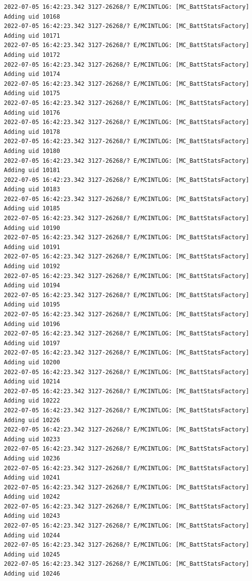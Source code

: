 \documentclass[a4paper,12pt]{book}
\begin{document}
\begin{lstlisting}
2022-07-05 16:42:23.342 3127-26268/? E/MCINTLOG: [MC_BattStatsFactory] Adding uid 10168
2022-07-05 16:42:23.342 3127-26268/? E/MCINTLOG: [MC_BattStatsFactory] Adding uid 10171
2022-07-05 16:42:23.342 3127-26268/? E/MCINTLOG: [MC_BattStatsFactory] Adding uid 10172
2022-07-05 16:42:23.342 3127-26268/? E/MCINTLOG: [MC_BattStatsFactory] Adding uid 10174
2022-07-05 16:42:23.342 3127-26268/? E/MCINTLOG: [MC_BattStatsFactory] Adding uid 10175
2022-07-05 16:42:23.342 3127-26268/? E/MCINTLOG: [MC_BattStatsFactory] Adding uid 10176
2022-07-05 16:42:23.342 3127-26268/? E/MCINTLOG: [MC_BattStatsFactory] Adding uid 10178
2022-07-05 16:42:23.342 3127-26268/? E/MCINTLOG: [MC_BattStatsFactory] Adding uid 10180
2022-07-05 16:42:23.342 3127-26268/? E/MCINTLOG: [MC_BattStatsFactory] Adding uid 10181
2022-07-05 16:42:23.342 3127-26268/? E/MCINTLOG: [MC_BattStatsFactory] Adding uid 10183
2022-07-05 16:42:23.342 3127-26268/? E/MCINTLOG: [MC_BattStatsFactory] Adding uid 10185
2022-07-05 16:42:23.342 3127-26268/? E/MCINTLOG: [MC_BattStatsFactory] Adding uid 10190
2022-07-05 16:42:23.342 3127-26268/? E/MCINTLOG: [MC_BattStatsFactory] Adding uid 10191
2022-07-05 16:42:23.342 3127-26268/? E/MCINTLOG: [MC_BattStatsFactory] Adding uid 10192
2022-07-05 16:42:23.342 3127-26268/? E/MCINTLOG: [MC_BattStatsFactory] Adding uid 10194
2022-07-05 16:42:23.342 3127-26268/? E/MCINTLOG: [MC_BattStatsFactory] Adding uid 10195
2022-07-05 16:42:23.342 3127-26268/? E/MCINTLOG: [MC_BattStatsFactory] Adding uid 10196
2022-07-05 16:42:23.342 3127-26268/? E/MCINTLOG: [MC_BattStatsFactory] Adding uid 10197
2022-07-05 16:42:23.342 3127-26268/? E/MCINTLOG: [MC_BattStatsFactory] Adding uid 10200
2022-07-05 16:42:23.342 3127-26268/? E/MCINTLOG: [MC_BattStatsFactory] Adding uid 10214
2022-07-05 16:42:23.342 3127-26268/? E/MCINTLOG: [MC_BattStatsFactory] Adding uid 10222
2022-07-05 16:42:23.342 3127-26268/? E/MCINTLOG: [MC_BattStatsFactory] Adding uid 10226
2022-07-05 16:42:23.342 3127-26268/? E/MCINTLOG: [MC_BattStatsFactory] Adding uid 10233
2022-07-05 16:42:23.342 3127-26268/? E/MCINTLOG: [MC_BattStatsFactory] Adding uid 10236
2022-07-05 16:42:23.342 3127-26268/? E/MCINTLOG: [MC_BattStatsFactory] Adding uid 10241
2022-07-05 16:42:23.342 3127-26268/? E/MCINTLOG: [MC_BattStatsFactory] Adding uid 10242
2022-07-05 16:42:23.342 3127-26268/? E/MCINTLOG: [MC_BattStatsFactory] Adding uid 10243
2022-07-05 16:42:23.342 3127-26268/? E/MCINTLOG: [MC_BattStatsFactory] Adding uid 10244
2022-07-05 16:42:23.342 3127-26268/? E/MCINTLOG: [MC_BattStatsFactory] Adding uid 10245
2022-07-05 16:42:23.342 3127-26268/? E/MCINTLOG: [MC_BattStatsFactory] Adding uid 10246

\end{lstlisting}
\end{document}
